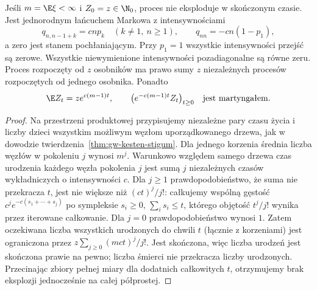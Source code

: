 \begin{twierdzenie}
\label{thm:ct-branching-general}
Jeśli $m=\E\xi<\infty$ i $Z_0=z\in\N_0$,
proces nie eksploduje w skończonym czasie.
Jest jednorodnym łańcuchem Markowa z intensywnościami
\[
q_{n,n-1+k}=cnp_k\quad(k\ne1,\ n\ge1),
\qquad q_{nn}=-cn(1-p_1),
\]
a zero jest stanem pochłaniającym. Przy $p_1=1$
wszystkie intensywności przejść są zerowe.
Wszystkie niewymienione intensywności
pozadiagonalne są równe zeru.
Proces rozpoczęty od $z$ osobników ma prawo sumy
$z$ niezależnych procesów rozpoczętych od jednego
osobnika. Ponadto
\[
\E Z_t=z e^{c(m-1)t},\qquad
\bigl(e^{-c(m-1)t}Z_t\bigr)_{t\ge0}
\quad\text{jest martyngałem.}
\]
\end{twierdzenie}
\begin{proof}
Na przestrzeni produktowej przypisujemy niezależne
pary czasu życia i liczby dzieci wszystkim możliwym
węzłom uporządkowanego drzewa, jak w dowodzie
twierdzenia~\ref{thm:gw-kesten-stigum}.
Dla jednego korzenia średnia liczba węzłów
w pokoleniu $j$ wynosi $m^j$. Warunkowo względem
samego drzewa czas urodzenia każdego węzła
pokolenia $j$ jest sumą $j$ niezależnych czasów
wykładniczych o intensywności $c$.
Dla $j\ge1$ prawdopodobieństwo, że suma nie
przekracza $t$, jest nie większe niż
$(ct)^j/j!$: całkujemy wspólną gęstość
$c^j e^{-c(s_1+\cdots+s_j)}$ po sympleksie
$s_i\ge0$, $\sum_i s_i\le t$, którego objętość
$t^j/j!$ wynika przez iterowane całkowanie.
Dla $j=0$ prawdopodobieństwo wynosi $1$.
Zatem oczekiwana liczba wszystkich urodzonych
do chwili $t$ (łącznie z korzeniami) jest
ograniczona przez $z\sum_{j\ge0}(mct)^j/j!$.
Jest skończona, więc liczba urodzeń jest skończona
prawie na pewno; liczba śmierci nie przekracza
liczby urodzonych. Przecinając zbiory pełnej
miary dla dodatnich całkowitych $t$, otrzymujemy
brak eksplozji jednocześnie na całej półprostej.


\end{proof}
